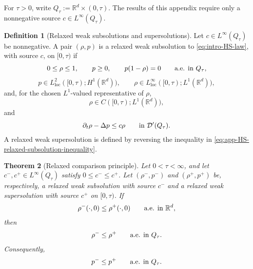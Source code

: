 \documentclass[11pt]{amsart}
\numberwithin{equation}{section}
\numberwithin{figure}{section}
\theoremstyle{plain}
\newtheorem{thm}{Theorem}[section]
\theoremstyle{definition}
\newtheorem{defn}[thm]{Definition}
\theoremstyle{remark}
\theoremstyle{plain}
\def\R{\mathbb{R}}
\begin{document}
For \(\tau>0\), write \(Q_\tau:=\R^d\times(0,\tau)\).
The results of this appendix require only a nonnegative source
\(c\in L^\infty(Q_\tau)\).

\begin{defn}[Relaxed weak subsolutions and supersolutions]
\label{def:app-HS-relaxed-subsuper}
Let \(c\in L^\infty(Q_\tau)\) be nonnegative.  A pair
\((\rho,p)\) is a relaxed weak subsolution to \eqref{eq:intro-HS-law}, with
source \(c\), on \([0,\tau)\) if
\begin{equation}\label{eq:app-HS-relaxed-graph}
    0\leq\rho\leq1,\qquad p\geq0,\qquad p(1-\rho)=0
    \qquad\hbox{a.e. in }Q_\tau,
\end{equation}
\begin{equation}\label{eq:app-HS-relaxed-regularity}
    p\in L^2_{\operatorname{loc}}([0,\tau);H^1(\R^d)),
    \qquad
    \rho\in L^\infty_{\operatorname{loc}}([0,\tau);L^1(\R^d)),
\end{equation}
and, for the chosen \(L^1\)-valued representative of \(\rho\),
\begin{equation}\label{eq:app-HS-relaxed-time-traces}
    \rho\in C([0,\tau);L^1(\R^d)),
\end{equation}
and
\begin{equation}\label{eq:app-HS-relaxed-subsolution-inequality}
    \partial_t\rho-\Delta p\leq c\rho
    \qquad\hbox{in }\mathcal D'(Q_\tau).
\end{equation}
A relaxed weak supersolution is defined by reversing the inequality in
\eqref{eq:app-HS-relaxed-subsolution-inequality}.
\end{defn}

\begin{thm}[Relaxed comparison principle]\label{thm:app-HS-relaxed-comparison}
Let \(0<\tau<\infty\), and let
\(c^-,c^+\in L^\infty(Q_\tau)\) satisfy \(0\leq c^-\leq c^+\).  Let
\((\rho^-,p^-)\) and \((\rho^+,p^+)\) be, respectively, a relaxed weak
subsolution with source \(c^-\) and a relaxed weak supersolution with source
\(c^+\) on \([0,\tau)\).  If
\begin{equation}\label{eq:app-HS-relaxed-initial-order}
    \rho^-(\cdot,0)\leq\rho^+(\cdot,0)
    \qquad\hbox{a.e. in }\R^d,
\end{equation}
then
\begin{equation}\label{eq:app-HS-relaxed-density-comparison}
    \rho^-\leq\rho^+
    \qquad\hbox{a.e. in }Q_\tau .
\end{equation}
Consequently,
\begin{equation}\label{eq:app-HS-relaxed-pressure-comparison}
    p^-\leq p^+
    \qquad\hbox{a.e. in }Q_\tau .
\end{equation}
\end{thm}
\end{document}
